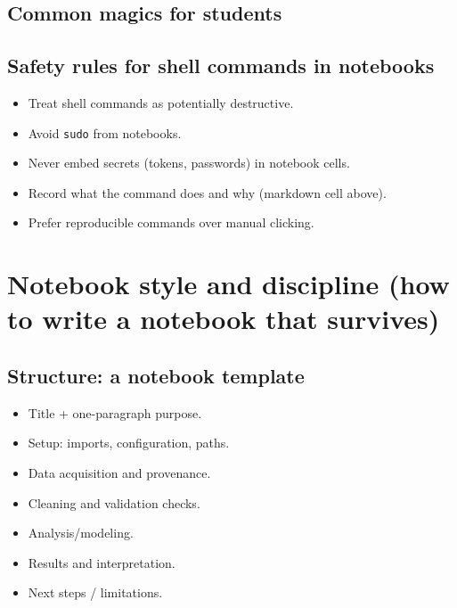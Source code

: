\subsection{Common magics for students}

\subsection{Safety rules for shell commands in notebooks}
\begin{itemize}
\item Treat shell commands as potentially destructive.
\item Avoid \texttt{sudo} from notebooks.
\item Never embed secrets (tokens, passwords) in notebook cells.
\item Record what the command does and why (markdown cell above).
\item Prefer reproducible commands over manual clicking.
\end{itemize}

\section{Notebook style and discipline (how to write a notebook that survives)}
\subsection{Structure: a notebook template}
\begin{itemize}
\item Title + one-paragraph purpose.
\item Setup: imports, configuration, paths.
\item Data acquisition and provenance.
\item Cleaning and validation checks.
\item Analysis/modeling.
\item Results and interpretation.
\item Next steps / limitations.
\end{itemize}

